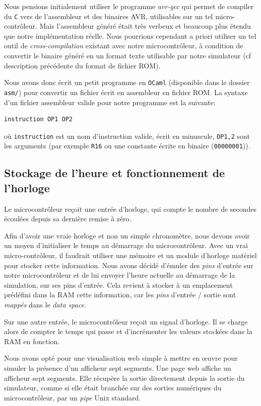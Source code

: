 \documentclass[11pt]{article}
\begin{document}
Nous pensions initialement utiliser le programme \emph{avr-gcc} qui permet de compiler du \texttt{C} vers de l'assembleur et des binaires AVR, utilisables sur un tel micro-contrôleur. Mais l'assembleur généré était très verbeux et beaucoup plus étendu que notre implémentation réelle. Nous pourrions cependant a priori utiliser un tel outil de \emph{cross-compilation} existant avec notre microcontrôleur, à condition de convertir le binaire généré en un format texte utilisable par notre simulateur (cf description précédente du format de fichier ROM).

Nous avons donc écrit un petit programme en \texttt{OCaml} (disponible dans le dossier \texttt{asm/}) pour convertir un fichier écrit en assembleur en fichier ROM. La syntaxe d'un fichier assembleur valide pour notre programme est la suivante:
\begin{verbatim}
instruction OP1 OP2
\end{verbatim}
où \texttt{instruction} est un nom d'instruction valide, écrit en minuscule, \texttt{OP1,2} sont les arguments (par exemple \texttt{R16} ou une constante écrite en binaire (\texttt{00000001})).


\subsection{Stockage de l'heure et fonctionnement de l'horloge}

Le microcontrôleur reçoit une entrée d'horloge, qui compte le nombre de secondes écoulées depuis sa dernière remise à zéro.

Afin d'avoir une vraie horloge et non un simple chronomètre, nous devons avoir un moyen d'initialiser le temps au démarrage du microcontrôleur. Avec un vrai micro-contrôleur, il faudrait utiliser une mémoire et un module d'horloge matériel pour stocker cette information. Nous avons décidé d'émuler des \emph{pins} d'entrée sur notre microcontrôleur et de lui envoyer l'heure actuelle au démarrage de la simulation, sur ses pins d'entrée. Cela revient à stocker à un emplacement prédéfini dans la RAM cette information, car les \emph{pins} d'entrée / sortie sont \emph{mappés} dans le \emph{data space}.

Sur une autre entrée, le microcontrôleur reçoit un signal d'horloge. Il se charge alors de compter le temps qui passe et d'incrémenter les valeurs stockées dans la RAM en fonction.

Nous avons opté pour une visualisation web simple à mettre en œuvre pour simuler la présence d'un afficheur sept segments. Une page web affiche un afficheur sept segments. Elle récupère la sortie directement depuis la sortie du simulateur, comme si elle était branchée sur des sorties numériques du microcontrôleur, par un \emph{pipe} Unix standard.
\end{document}
